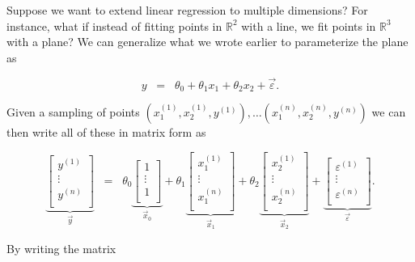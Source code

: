\documentclass{article}
\begin{document}
\vspace{1pc}

\noindent Suppose we want to extend linear regression to multiple dimensions?  For instance, what if instead of fitting points in $\mathbb{R}^2$ with a line, we fit points in $\mathbb{R}^3$ with a plane?  We can generalize what we wrote earlier to parameterize the plane as 

\begin{equation*}
y \;\; =\;\; \theta_0 + \theta_1x_1 + \theta_2 x_2 + \vec{\varepsilon}.
\end{equation*}

\noindent Given a sampling of points $(x_1^{(1)}, x_2^{(1)}, y^{(1)}), \ldots (x_1^{(n)}, x_2^{(n)}, y^{(n)})$ we can then write all of these in matrix form as 

\begin{equation*}
\underbrace{\left [ \begin{array}{c}
y^{(1)} \\
\vdots \\
y^{(n)} \\
\end{array} \right ]}_{\vec{y}} \;\; =\;\; \theta_0 \underbrace{\left [ \begin{array}{c}
1 \\
\vdots \\
1 \\
\end{array} \right ]}_{\vec{x}_0} + \theta_1 \underbrace{\left [ \begin{array}{c}
x_1^{(1)} \\
\vdots \\
x_1^{(n)} \\
\end{array} \right ]}_{\vec{x}_1}   +\theta_2 \underbrace{\left [ \begin{array}{c}
x_2^{(1)} \\
\vdots \\
x_2^{(n)} \\
\end{array} \right ]}_{\vec{x}_2}  + \underbrace{\left [ \begin{array}{c}
\varepsilon^{(1)} \\
\vdots \\
\varepsilon^{(n)} \\
\end{array} \right ]}_{\vec{\varepsilon}}. 
\end{equation*}

\noindent By writing the matrix 
\end{document}
